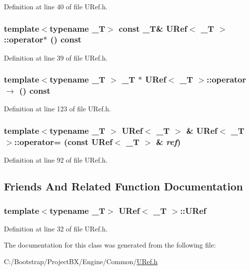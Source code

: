 Definition at line 40 of file URef.h.\hypertarget{class_u_ref_e6e1f7ea646d5988ea2d12639518e042}{
\subsubsection[{operator$\ast$}]{\setlength{\rightskip}{0pt plus 5cm}template$<$typename \_\-T$>$ const \_\-T\& {\bf URef}$<$ \_\-T $>$::operator$\ast$ () const}}
\label{class_u_ref_e6e1f7ea646d5988ea2d12639518e042}




Definition at line 39 of file URef.h.\hypertarget{class_u_ref_21d86cb3b553341b033f498d47091e15}{
\subsubsection[{operator-$>$}]{\setlength{\rightskip}{0pt plus 5cm}template$<$typename \_\-T $>$ \_\-T $\ast$ {\bf URef}$<$ \_\-T $>$::operator $\rightarrow$  () const}}
\label{class_u_ref_21d86cb3b553341b033f498d47091e15}




Definition at line 123 of file URef.h.\hypertarget{class_u_ref_df1f62d1ff5aba640b9b341d6f7686e1}{
\subsubsection[{operator=}]{\setlength{\rightskip}{0pt plus 5cm}template$<$typename \_\-T $>$ {\bf URef}$<$ \_\-T $>$ \& {\bf URef}$<$ \_\-T $>$::operator= (const {\bf URef}$<$ \_\-T $>$ \& {\em ref})}}
\label{class_u_ref_df1f62d1ff5aba640b9b341d6f7686e1}




Definition at line 92 of file URef.h.

\subsection{Friends And Related Function Documentation}
\hypertarget{class_u_ref_b61ec4575c614503f78987c752b49372}{
\subsubsection[{URef}]{\setlength{\rightskip}{0pt plus 5cm}template$<$typename \_\-T$>$ {\bf URef}$<$ \_\-T $>$::{\bf URef}}}
\label{class_u_ref_b61ec4575c614503f78987c752b49372}




Definition at line 32 of file URef.h.

The documentation for this class was generated from the following file:\begin{CompactItemize}
\item 
C:/Bootstrap/ProjectBX/Engine/Common/\hyperlink{_u_ref_8h}{URef.h}\end{CompactItemize}
